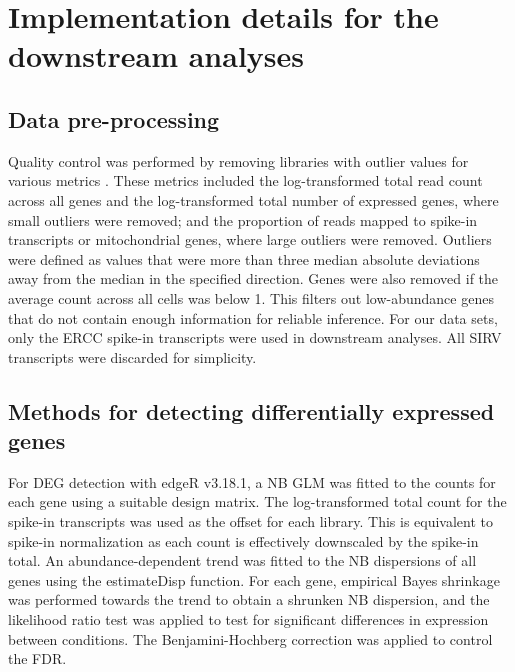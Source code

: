 \documentclass{article}
\begin{document}
\section{Implementation details for the downstream analyses}

\subsection{Data pre-processing}
Quality control was performed by removing libraries with outlier values for various metrics \citep{lun2016stepbystep}.
These metrics included the log-transformed total read count across all genes and the log-transformed total number of expressed genes, where small outliers were removed; 
and the proportion of reads mapped to spike-in transcripts or mitochondrial genes, where large outliers were removed.
Outliers were defined as values that were more than three median absolute deviations away from the median in the specified direction.
Genes were also removed if the average count across all cells was below 1.
This filters out low-abundance genes that do not contain enough information for reliable inference.
For our data sets, only the ERCC spike-in transcripts were used in downstream analyses.
All SIRV transcripts were discarded for simplicity.

\subsection{Methods for detecting differentially expressed genes}
For DEG detection with edgeR v3.18.1, a NB GLM was fitted to the counts for each gene \citep{mccarthy2012differential} using a suitable design matrix.
The log-transformed total count for the spike-in transcripts was used as the offset for each library.
This is equivalent to spike-in normalization as each count is effectively downscaled by the spike-in total.
An abundance-dependent trend was fitted to the NB dispersions of all genes using the estimateDisp function.
For each gene, empirical Bayes shrinkage was performed towards the trend to obtain a shrunken NB dispersion, and the likelihood ratio test was applied to test for significant differences in expression between conditions.
The Benjamini-Hochberg correction was applied to control the FDR.
\end{document}
